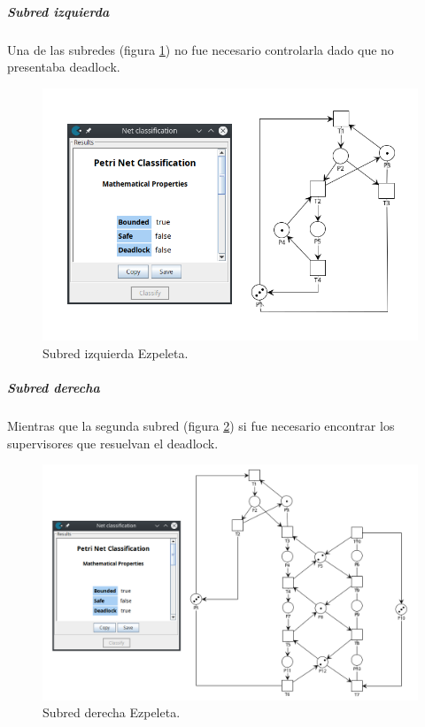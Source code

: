 \subparagraph{Subred izquierda}
\hfill \break
Una de las subredes (figura \ref{fig:ezpeletasubizquierda}) no fue necesario controlarla dado que no presentaba deadlock.

\begin{figure}[H]
	\centering
	\includegraphics[scale=0.55]{Figures/algoritmo3/ezpeleta2.png}
	\caption{Subred izquierda Ezpeleta.}
	\label{fig:ezpeletasubizquierda}
 \end{figure}

\subparagraph{Subred derecha}
\hfill \break
Mientras que la segunda subred (figura \ref{fig:ezpeletasubderecha}) si fue necesario encontrar los supervisores que resuelvan el deadlock. \\
\bigskip

\begin{figure}[H]
	\centering
	\includegraphics[scale=0.5]{Figures/algoritmo3/ezpeleta3.png}
	\caption{Subred derecha Ezpeleta.}
	\label{fig:ezpeletasubderecha}
 \end{figure}
\bigskip

